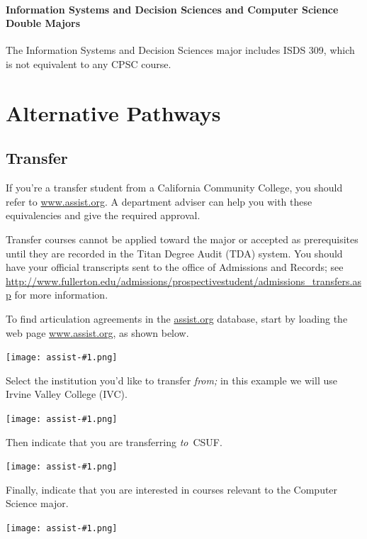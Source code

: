 \documentclass{book}
\newcommand{\CampusName}{CSUF}
\begin{document}
\subsubsection{Information Systems and Decision Sciences and Computer Science Double Majors}

The Information Systems and Decision Sciences major includes ISDS 309, which is not equivalent to any CPSC course.
 
\chapter{Alternative Pathways}

\section{Transfer}

If you're a transfer student from a California Community College, you should refer to \url{www.assist.org}. A department adviser can help you with these equivalencies and give the required approval.

Transfer courses cannot be applied toward the major or accepted as prerequisites until they are recorded in the Titan Degree Audit (TDA) system. You should have your official transcripts sent to the office of Admissions and Records; see \url{http://www.fullerton.edu/admissions/prospectivestudent/admissions_transfers.asp} for more information.

To find articulation agreements in the \url{assist.org} database, start by loading the web page \url{www.assist.org}, as shown below.

\newcommand{\AssistOrgScreenshot}[1]{
  \begin{center}
    \texttt{[image: assist-\#1.png]}
  \end{center}
}

\AssistOrgScreenshot{1}

Select the institution you'd like to transfer \emph{from;} in this example we will use Irvine Valley College (IVC).

\AssistOrgScreenshot{2}

Then indicate that you are transferring \emph{to}~\CampusName.

\AssistOrgScreenshot{3}

Finally, indicate that you are interested in courses relevant to the Computer Science major.

\AssistOrgScreenshot{4}
\end{document}
